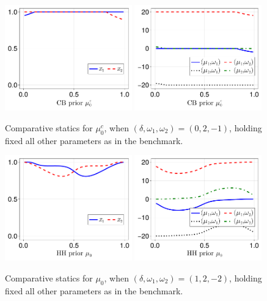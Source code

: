 \documentclass[12pt,a4paper]{article}
\begin{document}
\begin{figure}[H]
\centering
\includegraphics[width=0.49\textwidth]{figures/V8/γ_10/fig_optimal_π_across_μ_0_c_ω_1_2_ω_2_-1_δ_0.0_.pdf}
\includegraphics[width=0.49\textwidth]{figures/V8/γ_10/fig_posterior_across_μ_0_c_ω_1_2_ω_2_-1_δ_0.0_.pdf}
\caption{Comparative statics for $\mu_0^c$, when $(\delta,\omega_1,\omega_2)=(0,2,-1)$, holding fixed all other parameters as in the benchmark.}
\label{FigureA12}
\end{figure}

\begin{figure}[H]
\centering
\includegraphics[width=0.49\textwidth]{figures/V8/γ_10/fig_optimal_π_across_μ_0_ω_1_2_ω_2_-2_δ_1.0_.pdf}
\includegraphics[width=0.49\textwidth]{figures/V8/γ_10/fig_posterior_across_μ_0_ω_1_2_ω_2_-2_δ_1.0_.pdf}
\caption{Comparative statics for $\mu_0$, when $(\delta,\omega_1,\omega_2)=(1,2,-2)$, holding fixed all other parameters as in the benchmark.}
\label{FigureA13}
\end{figure}
\end{document}
